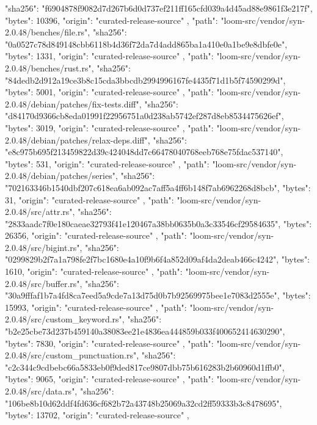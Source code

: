 {{      "sha256": "f6904878f9082d7d267b6d0d737ef211ff165cfd039a4d45ad88e9861f3e217f",
      "bytes": 10396,
      "origin": "curated-release-source"
    },
    {
      "path": "loom-src/vendor/syn-2.0.48/benches/file.rs",
      "sha256": "0a0527c78d849148cbb6118b4d36f72da7d4add865ba1a410e0a1be9e8dbfe0e",
      "bytes": 1331,
      "origin": "curated-release-source"
    },
    {
      "path": "loom-src/vendor/syn-2.0.48/benches/rust.rs",
      "sha256": "84dedb2d912a19ce3b8c15cda3bbcdb2994996167fe4435f71d1b5f74590299d",
      "bytes": 5001,
      "origin": "curated-release-source"
    },
    {
      "path": "loom-src/vendor/syn-2.0.48/debian/patches/fix-tests.diff",
      "sha256": "d84170d9366cb8eda01991f22956751a0d238ab5742ef287d8eb8534475626ef",
      "bytes": 3019,
      "origin": "curated-release-source"
    },
    {
      "path": "loom-src/vendor/syn-2.0.48/debian/patches/relax-deps.diff",
      "sha256": "e8c975b695f213459822d39c424048dd7c66478040768eeb768e75fdac537140",
      "bytes": 531,
      "origin": "curated-release-source"
    },
    {
      "path": "loom-src/vendor/syn-2.0.48/debian/patches/series",
      "sha256": "702163346b1540dbf207c618ea6ab092ac7aff5a4ff6b148f7ab6962268d8bcb",
      "bytes": 31,
      "origin": "curated-release-source"
    },
    {
      "path": "loom-src/vendor/syn-2.0.48/src/attr.rs",
      "sha256": "2833aadc7f0e180caeae32793f41e120467a38bb0635b0a3c33546cf29584635",
      "bytes": 26356,
      "origin": "curated-release-source"
    },
    {
      "path": "loom-src/vendor/syn-2.0.48/src/bigint.rs",
      "sha256": "0299829b2f7a1a798fe2f7bc1680e4a10f9b6f4a852d09af4da2deab466c4242",
      "bytes": 1610,
      "origin": "curated-release-source"
    },
    {
      "path": "loom-src/vendor/syn-2.0.48/src/buffer.rs",
      "sha256": "30a9fffaf1b7a4fd8ca7eed5a9cde7a13d75d0b7b92569975bee1e7083d2555e",
      "bytes": 15993,
      "origin": "curated-release-source"
    },
    {
      "path": "loom-src/vendor/syn-2.0.48/src/custom_keyword.rs",
      "sha256": "b2e25cbe73d237b459140a38083ee21e4836ea444859b033f400652414630290",
      "bytes": 7830,
      "origin": "curated-release-source"
    },
    {
      "path": "loom-src/vendor/syn-2.0.48/src/custom_punctuation.rs",
      "sha256": "c2c344c9cdbebc66a5833eb0f9ded817ce9807dbb75b616283b2b60960d1ffb0",
      "bytes": 9065,
      "origin": "curated-release-source"
    },
    {
      "path": "loom-src/vendor/syn-2.0.48/src/data.rs",
      "sha256": "106be8b10d62ddf4fd636cf682b72a43748b25069a32cd2ff59333b3c8478695",
      "bytes": 13702,
      "origin": "curated-release-source"
    },
}
